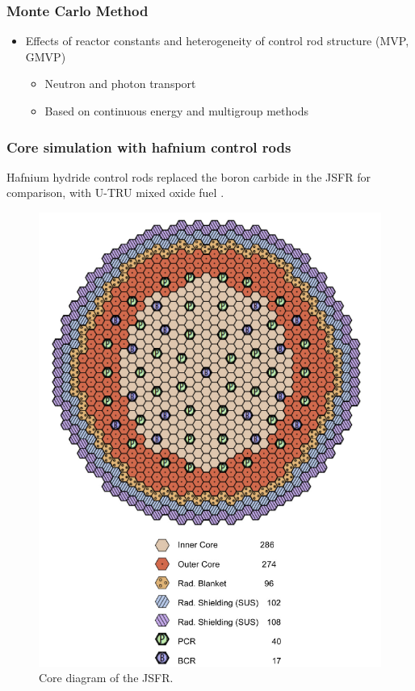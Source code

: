 \documentclass[9pt]{beamer}
\begin{document}
\begin{frame}
\frametitle{Monte Carlo Method}
\begin{itemize}
    \item Effects of reactor constants and heterogeneity of control rod structure (MVP, GMVP) \cite{nagaya_mvp/gmvp_2005}  
    \begin{itemize}
        \item Neutron and photon transport
        \item Based on continuous energy and multigroup methods
    \end{itemize}
\end{itemize}
\end{frame}



\begin{frame}
\frametitle{Core simulation with hafnium control rods}
Hafnium hydride control rods replaced the boron carbide in the
\gls{JSFR} \cite{ogura_conceptual_2009} for comparison, with U-TRU mixed oxide fuel \cite{ikeda_application_2014}.
\begin{figure}[htbp!]
  \begin{center}
      \includegraphics[scale=0.15]{./images/core.png}
  \end{center}
  \caption{Core diagram of the \gls{JSFR}.}
  \label{fig:core}
\end{figure}
\end{frame}
\end{document}
